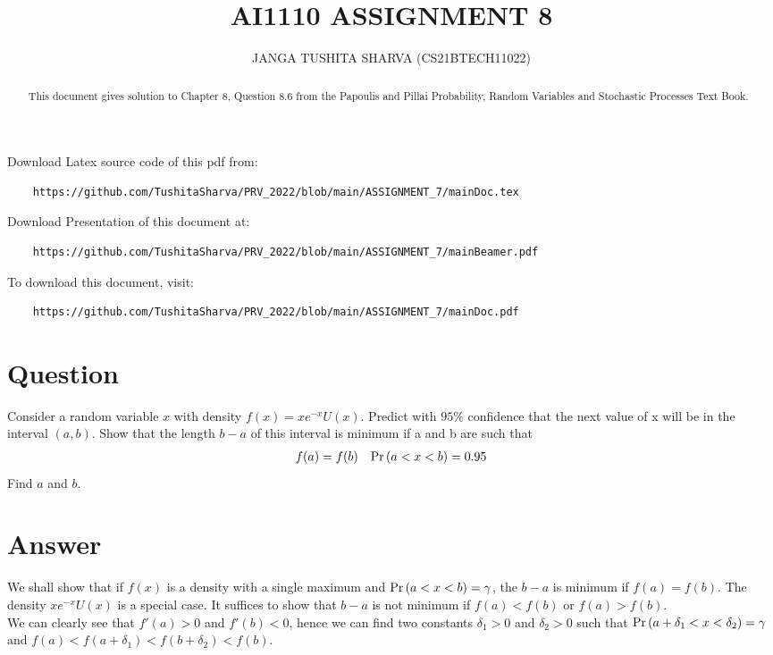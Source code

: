 \documentclass[journal,12pt,twocolumn]{IEEEtran}
\begin{document}
    
\title{
	AI1110 ASSIGNMENT 8
}
\author{ JANGA TUSHITA SHARVA (CS21BTECH11022)%
}	

\maketitle


\begin{abstract}
This document gives solution to Chapter 8, Question 8.6 from the Papoulis and Pillai Probability, Random Variables and Stochastic Processes Text Book.
\end{abstract}

Download Latex source code of this pdf from: 
\begin{lstlisting}
    https://github.com/TushitaSharva/PRV_2022/blob/main/ASSIGNMENT_7/mainDoc.tex
\end{lstlisting}

Download Presentation of this document at:
\begin{lstlisting}
    https://github.com/TushitaSharva/PRV_2022/blob/main/ASSIGNMENT_7/mainBeamer.pdf
\end{lstlisting}

To download this document, visit: 
\begin{lstlisting}
    https://github.com/TushitaSharva/PRV_2022/blob/main/ASSIGNMENT_7/mainDoc.pdf
\end{lstlisting}

\section{Question}
Consider a random variable $x$ with density $f(x) = xe^{-x}U(x)$. Predict with $95\%$ confidence that the next value of x will be in the interval $(a, b)$. Show that the length $b-a$ of this interval is minimum if a and b are such that\\
        \begin{align}
            f(a) = f(b) && \Pr\left(a < x < b\right) = 0.95
        \end{align}
        Find $a$ and $b$.

\section{Answer}
We shall show that if $f(x)$ is a density with a single maximum and $\Pr\left(a < x < b\right) = \gamma$, the $b-a$ is minimum if $f(a) = f(b)$. The density $xe^{-x}U(x)$ is a special case. It suffices to show that $b-a$ is not minimum if $f(a) < f(b)$ or $f(a) > f(b)$.\\
We can clearly see that $f'(a) > 0$ and $f'(b) < 0$, hence we can find two constants $\delta_1 > 0$ and $\delta_2 > 0$ such that $\Pr\left(a+ \delta_1 < x < \delta_2\right) = \gamma$ and $f(a) < f(a + \delta_1) < f(b + \delta_2) < f(b)$.\\
 
\end{document}
